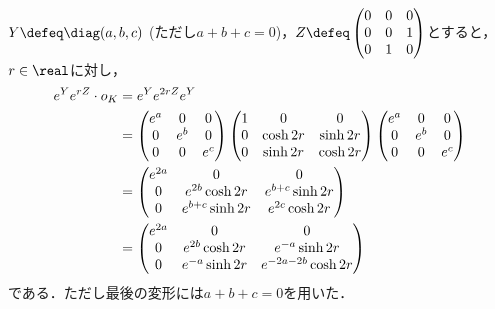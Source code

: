 \begin{npfwn}
  $Y \defeq \diag(a,b,c)  $ (ただし$a + b + c = 0$)，$Z \defeq
  \begin{pmatrix}
    0 & 0 & 0\\
    0 & 0 & 1\\
    0 & 1 & 0
  \end{pmatrix}
  $とすると，$r\in \real$に対し，
  \begin{align}
    e^{Y}e^{rZ}\cdot o_K &= e^{Y}e^{2rZ}e^{Y}\notag\\
                         &=
                           \begin{pmatrix}
                             e^{a} & 0 & 0 \\
                             0 & e^{b} & 0\\
                             0 & 0 & e^{c}
                           \end{pmatrix}
                                     \begin{pmatrix}
                                       1 & 0 & 0\\
                                       0 & \cosh 2r & \sinh 2r \\
                                       0 & \sinh 2r & \cosh 2r
                                     \end{pmatrix}
                                                      \begin{pmatrix}
                                                        e^{a} & 0 & 0 \\
                                                        0 & e^{b} & 0\\
                                                        0 & 0 & e^{c}
                                                      \end{pmatrix}\notag\\
                         &=
                           \begin{pmatrix}
                             e^{2a} & 0 & 0\\
                             0 & e^{2b}\cosh 2r & e^{b+c}\sinh 2r \\
                             0 & e^{b+c}\sinh 2r & e^{2c}\cosh 2r
                           \end{pmatrix}\notag\\
                         &= \begin{pmatrix}
                             e^{2a} & 0 & 0\\
                             0 & e^{2b}\cosh 2r & e^{-a}\sinh 2r \\
                             0 & e^{-a}\sinh 2r & e^{-2a-2b}\cosh 2r
                           \end{pmatrix}\label{eq:0114-2}
  \end{align}
  である．ただし最後の変形には$a + b + c = 0$を用いた．


\end{npfwn}

